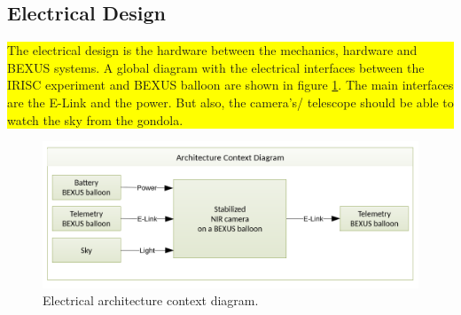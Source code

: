 \pagebreak
\subsection{Electrical Design}
\colorbox{yellow}{\parbox{\textwidth}{The electrical design is the hardware between the mechanics, hardware and BEXUS systems. A global diagram with the electrical interfaces between the IRISC experiment and BEXUS balloon are shown in figure \ref{fig:elec-ACD}. The main interfaces are the E-Link and the power. But also, the camera's/ telescope should be able to watch the sky from the gondola.}}
\vspace{-.5cm}
\begin{figure}[H]
	\centering
	\includegraphics[width=.6\textwidth]{4-experiment-design/img/electrical/ArchitectureContext.png}
	\caption{Electrical architecture context diagram.}
	\label{fig:elec-ACD}
\end{figure}


